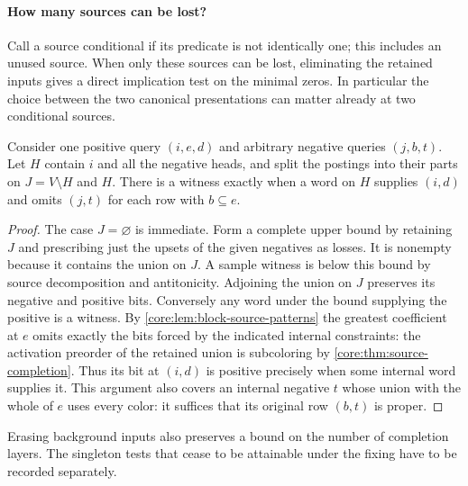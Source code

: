 \paragraph{How many sources can be lost?}
Call a source conditional if its predicate is not identically one;
this includes an unused source. When only these sources can be
lost, eliminating the retained inputs gives a direct implication
test on the minimal zeros. In particular the choice between the
two canonical presentations can matter already at two conditional
sources.

\begin{lemma}
\label{core:lem:unmarked-background}
Consider one positive query $(i,e,d)$ and arbitrary negative queries
$(j,b,t)$. Let $H$ contain $i$ and all the negative heads, and
split the postings into their parts on $J=V\setminus H$ and $H$.
There is a witness exactly when a word on $H$ supplies $(i,d)$
and omits $(j,t)$ for each row with $b\subseteq e$.
\end{lemma}
\begin{proof}
The case $J=\varnothing$ is immediate. Form a complete upper bound
by retaining $J$ and prescribing just the upsets of the given
negatives as losses. It is nonempty because it contains the union
on $J$. A sample witness is below this bound by source decomposition
and antitonicity. Adjoining the union on $J$ preserves its
negative and positive bits. Conversely any word under the bound
supplying the positive is a witness. By
\cref{core:lem:block-source-patterns} the greatest coefficient at $e$
omits exactly the bits forced by the indicated internal constraints:
the activation preorder of the retained union is subcoloring by
\cref{core:thm:source-completion}. Thus its bit at $(i,d)$ is
positive precisely when some internal word supplies it. This
argument also covers an internal negative $t$ whose union with the
whole of $e$ uses every color: it suffices that its original row
$(b,t)$ is proper.
\end{proof}

Erasing background inputs also preserves a bound on the number of
completion layers. The singleton tests that cease to be attainable
under the fixing have to be recorded separately.

